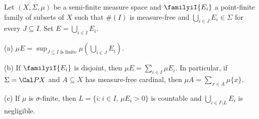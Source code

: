  Let $(X,\Sigma,\mu)$ be a semi-finite measure
space and $\familyiI{E_i}$ a point-finite family of subsets of $X$ such
that $\#(I)$ is measure-free and
$\bigcup_{i\in J}E_i\in\Sigma$ for every $J\subseteq I$.   Set
$E=\bigcup_{i\in I}E_i$.

(a) $\mu E
=\sup_{J\subseteq I\text{ is finite}}\mu(\bigcup_{i\in J}E_i)$.

(b) If $\familyiI{E_i}$ is disjoint, then
$\mu E=\sum_{i\in I}\mu E_i$.   In particular, if $\Sigma=\Cal PX$ and
$A\subseteq X$ has measure-free cardinal, then
$\mu A=\sum_{x\in A}\mu\{x\}$.

(c) If $\mu$ is $\sigma$-finite, then $L=\{i:i\in I,\,\mu E_i>0\}$ is
countable and $\bigcup_{i\in I\setminus L}E_i$ is negligible.

